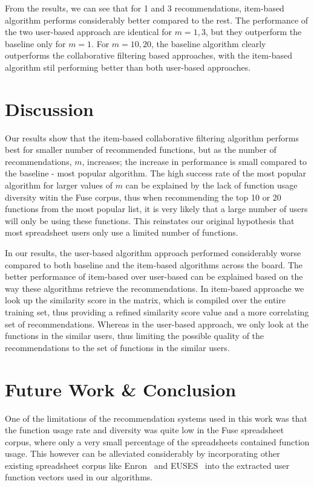 \documentclass{article} %
\begin{document}
From the results, we can see that for 1 and 3 recommendations, item-based algorithm performs considerably better compared to the rest. The performance of the two user-based approach are identical for $m=1,3$, but they outperform the baseline only for $m=1$. For $m=10,20$, the baseline algorithm clearly outperforms the collaborative filtering based approaches, with the item-based algorithm stil performing better than both user-based approaches.

\section{Discussion}
Our results show that the item-based collaborative filtering algorithm performs best for smaller number of recommended functions, but as the number of recommendations, $m$, increases; the increase in performance is small compared to the baseline - most popular algorithm. The high success rate of the most popular algorithm for larger values of $m$ can be explained by the lack of function usage diversity witin the Fuse corpus, thus when recommending the top 10 or 20 functions from the most popular list, it is very likely that a large number of users will only be using these functions. This reinstates our original hypothesis that most spreadsheet users only use a limited number of functions.

In our results, the user-based algorithm approach performed considerably worse compared to both baseline and the item-based algorithms across the board. The better performance of item-based over user-based can be explained based on the way these algorithms retrieve the recommendations. In item-based approache we look up the similarity score in the matrix, which is compiled over the entire training set, thus providing a refined similarity score value and a more correlating set of recommendations. Whereas in the user-based approach, we only look at the functions in the similar users, thus limiting the possible quality of the recommendations to the set of functions in the similar users.

\section{Future Work \& Conclusion}
One of the limitations of the recommendation systems used in this work was that the function usage rate and diversity was quite low in the Fuse spreadsheet corpus, where only a very small percentage of the spreadsheets contained function usage. This however can be alleviated considerably by incorporating other existing spreadsheet corpus like Enron~\cite{hermans2014enron} and EUSES~\cite{fisher2005euses} into the extracted user function vectors used in our algorithms.
\end{document}
